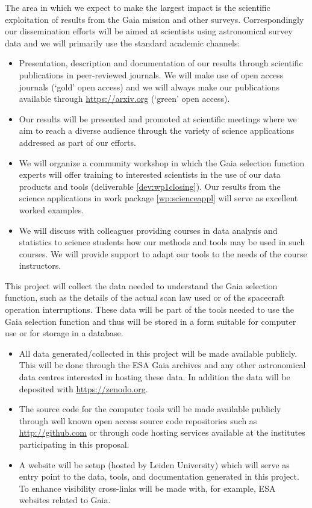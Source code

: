 The area in which we expect to make the largest impact is the scientific exploitation of results from the Gaia mission and other surveys. Correspondingly our dissemination efforts will be aimed at scientists using astronomical survey data and we will primarily use the standard academic channels:
\begin{itemize}
    \item Presentation, description and documentation of our results through scientific publications in peer-reviewed journals. We will make use of open access journals (`gold' open access) and we will always make our publications available through \url{https://arxiv.org} (`green' open access).
    \item Our results will be presented and promoted at scientific meetings where we aim to reach a diverse audience through the variety of science applications addressed as part of our efforts.
    \item We will organize a community workshop in which the Gaia selection function experts will offer training to interested scientists in the use of our data products and tools (deliverable \ref{dev:wp1closing}). Our results from the science applications in work package \ref{wp:scienceappl} will serve as excellent worked examples.
    \item We will discuss with colleagues providing courses in data analysis and statistics to science students how our methods and tools may be used in such courses. We will provide support to adapt our tools to the needs of the course instructors.
\end{itemize}

This project will collect the data needed to understand the Gaia selection function, such as the details of the actual scan law used or of the spacecraft operation interruptions. These data will be part of the tools needed to use the Gaia selection function and thus will be stored in a form suitable for computer use or for storage in a database.
\begin{itemize}
    \item All data generated/collected in this project will be made available publicly. This will be done through the ESA Gaia archives and any other astronomical data centres interested in hosting these data. In addition the data will be deposited with \url{https://zenodo.org}.
    \item The source code for the computer tools will be made available publicly through well known open access source code repositories such as \url{http://github.com} or through code hosting services available at the institutes participating in this proposal.
    \item A website will be setup (hosted by Leiden University) which will serve as entry point to the data, tools, and documentation generated in this project. To enhance visibility cross-links will be made with, for example, ESA websites related to Gaia.
\end{itemize}

